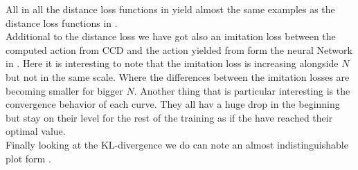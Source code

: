 All in all the distance loss functions in  yield almost the same examples as the distance loss functions in .\\
Additional to the distance loss we have got also an imitation loss between the computed action from  CCD and the action yielded from form the neural Network in . Here it is interesting to note that the imitation loss is increasing alongside $N$ but not in the same scale. Where the differences between the imitation losses are becoming smaller for bigger $N$. Another thing that is particular interesting is the convergence behavior of each curve. They all hav a huge drop in the beginning but stay on their level for the rest of the training as if the have reached their optimal value. \\
Finally looking at the KL-divergence we do can note an almost indistinguishable plot form .


